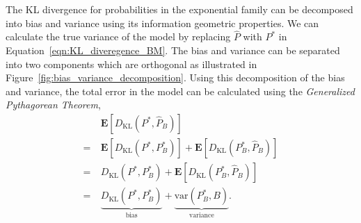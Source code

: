 \documentclass[letterpaper]{article} %
\begin{document}
		The KL divergence for probabilities in the exponential family can be decomposed into bias and variance using its information geometric properties. We can calculate the true variance of the model by replacing $\hat{P}$ with $P^*$ in Equation~\eqref{eqn:KL_diveregence_BM}. The bias and variance can be separated into two components which are orthogonal as illustrated in Figure~\ref{fig:bias_variance_decomposition}. Using this decomposition of the bias and variance, the total error in the model can be calculated using the \textit{Generalized Pythagorean Theorem},
		\begin{align*}
				&\mathbf{E} \left[ D_{\mathrm{KL}}  \left( P^{*}, \hat{P}_{B} \right) \right] \\
                =\ &\mathbf{E} \left[ D_{\mathrm{KL}} \left( P^{*}, P^{*}_{B} \right) \right] + \mathbf{E} \left[ D_{\mathrm{KL}} \left( P^{*}_{B}, \hat{P}_{B} \right) \right]\\
				=\ &D_{\mathrm{KL}} \left( P^{*}, P^{*}_{B} \right) + \mathbf{E} \left[ D_{\mathrm{KL}} \left( P^{*}_{B}, \hat{P}_{B} \right) \right] \\
				=\ &\underbrace{D_{\mathrm{KL}} \left( P^{*}, P^{*}_{B} \right)}_{\mathrm{bias}} + \underbrace{\mathrm{var} \left( P^{*}_B, B \right)}_{\mathrm{variance}}.
		\end{align*}
        
\end{document}
